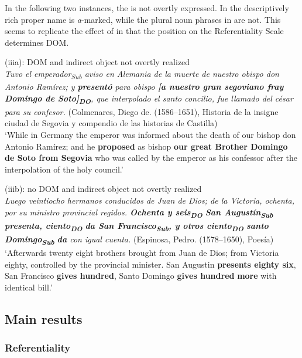 \documentclass[output=paper]{LSP/langsci}
\begin{document}
In the following two instances, the  is not overtly expressed. In  the descriptively rich proper name is \textit{a}-marked, while the  plural noun phrases in  are not. This seems to replicate the effect of  \vs {} in that the position on the Referentiality Scale determines DOM. 

\ea(iiia): DOM and indirect object not overtly realized\\\label{11-he-ex:48}
\emph{Tuvo el emperador\textsubscript{Sub} aviso en Alemania de la muerte de nuestro obispo don Antonio Ramírez; y \textbf{presentó} para obispo \textbf{[a nuestro gran segoviano fray Domingo de Soto]}\textbf{\textsubscript{DO}}, que interpolado el santo concilio, fue llamado del césar para su confesor.} (Colmenares, Diego de. (1586–1651), Historia de la insigne ciudad de Segovia y compendio de las historias de Castilla)\\
\glt ‘While in Germany the emperor was informed about the death of our bishop don Antonio Ramírez; and he \textbf{proposed} as bishop \textbf{our great Brother Domingo de Soto from Segovia} who was called by the emperor as his confessor after the interpolation of the holy council.’
\z

\ea(iiib): no DOM and indirect object not overtly realized\\\label{11-he-ex:49}
\emph{Luego veintiocho hermanos conducidos de Juan de Dios; de la Victoria, ochenta, por su ministro provincial regidos. \textbf{Ochenta y seis}\textbf{\textsubscript{DO}}\textbf{ San Augustín}\textbf{\textsubscript{Sub}}\textbf{ presenta, ciento}\textbf{\textsubscript{DO}}\textbf{ da San Francisco}\textbf{\textsubscript{Sub}}\textbf{, y otros ciento}\textbf{\textsubscript{DO}} \textbf{santo Domingo}\textbf{\textsubscript{Sub}}\textbf{ da} con igual cuenta.}  (Espinosa, Pedro. (1578–1650), Poesía)\\
\glt ‘Afterwards twenty eight brothers brought from Juan de Dios; from Victoria eighty, controlled by the provincial minister. San Augustin \textbf{presents eighty six}, San Francisco \textbf{gives hundred}, Santo Domingo \textbf{gives hundred} \textbf{more} with identical bill.’
\z

\subsection{Main results}\label{11-subsec:4-3}

\subsubsection{Referentiality}\label{11-subsubsec:4-3-1}
\end{document}
